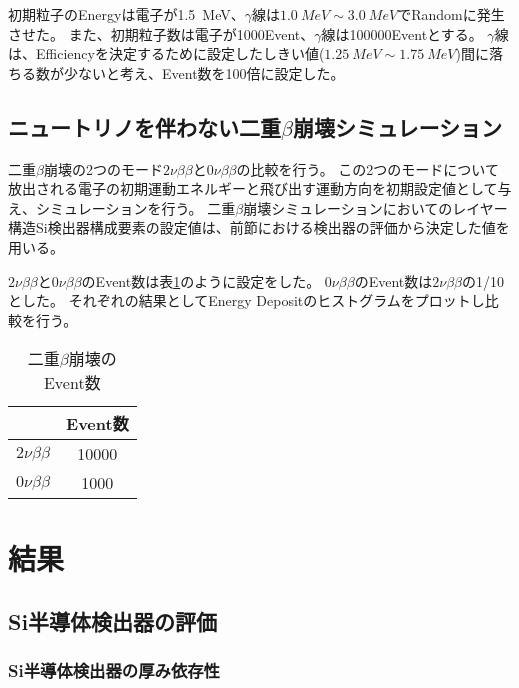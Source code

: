 \documentclass[a4paper,10pt]{jreport}
\begin{document}
初期粒子のEnergyは電子が\SI{1.5}{MeV}、$\gamma$線は$\SI{1.0}{MeV}\sim\SI{3.0}{MeV}$でRandomに発生させた。
また、初期粒子数は電子が1000Event、$\gamma$線は100000Eventとする。
$\gamma$線は、Efficiencyを決定するために設定したしきい値($\SI{1.25}{MeV}\sim\SI{1.75}{MeV}$)間に落ちる数が少ないと考え、Event数を100倍に設定した。



\section{ニュートリノを伴わない二重$\beta$崩壊シミュレーション}

二重$\beta$崩壊の2つのモード$2\nu\beta\beta$と$0\nu\beta\beta$の比較を行う。
この2つのモードについて放出される電子の初期運動エネルギーと飛び出す運動方向を初期設定値として与え、シミュレーションを行う。
二重$\beta$崩壊シミュレーションにおいてのレイヤー構造Si検出器構成要素の設定値は、前節における検出器の評価から決定した値を用いる。

$2\nu\beta\beta$と$0\nu\beta\beta$のEvent数は表\ref{Tab-DoubleBetaDecay}のように設定をした。
$0\nu\beta\beta$のEvent数は$2\nu\beta\beta$の1/10とした。
それぞれの結果としてEnergy Depositのヒストグラムをプロットし比較を行う。

\begin{table}[H] 
	\center
	\caption{二重$\beta$崩壊のEvent数} \label{Tab-DoubleBetaDecay}
	\begin{tabular}{cc}
	\hline
	 & Event数 \\
	 \hline
	$2\nu\beta\beta$ & 10000 \\
	$0\nu\beta\beta$ & 1000 \\
	\hline
	\end{tabular}
\end{table}



\chapter{結果}



\section{Si半導体検出器の評価}

\subsection{Si半導体検出器の厚み依存性}
\end{document}
